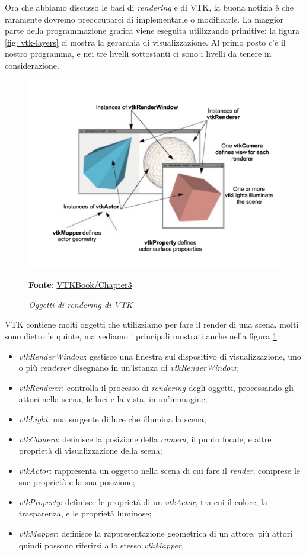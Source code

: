 Ora che abbiamo discusso le basi di \emph{rendering} e di VTK, la buona notizia è che raramente dovremo preoccuparci di implementarle o modificarle. La maggior parte della programmazione grafica viene eseguita utilizzando primitive: la figura \ref{fig: vtk-layers} ci mostra la gerarchia di visualizzazione. Al primo posto c'è il nostro programma, e nei tre livelli sottostanti ci sono i livelli da tenere in considerazione.

\begin{figure}[h]
    \centering
    \includegraphics[scale=0.5]{immagini/volumerendering/vtkobjects.png}
    \caption{\textit{Oggetti di rendering di VTK}}
    \textbf{Fonte}: \href{https://lorensen.github.io/VTKExamples/site/VTKBook/03Chapter3/}{VTKBook/Chapter3}
    \label{fig: Oggetti Rendering VTK}
\end{figure}

VTK contiene molti oggetti che utilizziamo per fare il render di una scena, molti sono dietro le quinte, ma vediamo i principali mostrati anche nella figura \ref{fig: Oggetti Rendering VTK}:
\begin{itemize}
\item \emph{vtkRenderWindow}: gestisce una finestra sul dispositivo di visualizzazione, uno o più \emph{renderer} disegnano in un'istanza di \emph{vtkRenderWindow};
\item \emph{vtkRenderer}: controlla il processo di \emph{rendering} degli oggetti, processando gli attori nella scena, le luci e la vista, in un'immagine;
\item \emph{vtkLight}: una sorgente di luce che illumina la scena;
\item \emph{vtkCamera}: definisce la posizione della \emph{camera}, il punto focale, e altre proprietà di visualizzazione della scena;
\item \emph{vtkActor}: rappresenta un oggetto nella scena di cui fare il \emph{render}, comprese le sue proprietà e la sua posizione;
\item \emph{vtkProperty}: definisce le proprietà di un \emph{vtkActor}, tra cui il colore, la trasparenza, e le proprietà luminose;  
\item \emph{vtkMapper}: definisce la rappresentazione geometrica di un attore, più attori quindi possono riferirsi allo stesso \emph{vtkMapper}.
\end{itemize}

